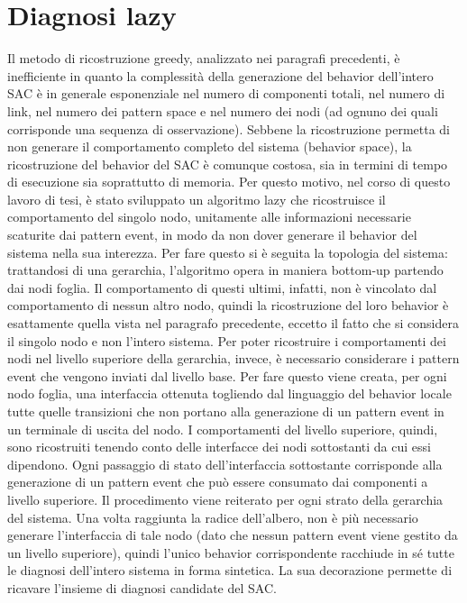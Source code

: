 \newpage
\section{Diagnosi lazy}
Il metodo di ricostruzione greedy, analizzato nei paragrafi precedenti, è inefficiente in quanto la complessità della generazione del behavior dell'intero SAC è in generale esponenziale nel numero di componenti totali, nel numero di link, nel numero dei pattern space e nel numero dei nodi (ad ognuno dei quali corrisponde una sequenza di osservazione). Sebbene la ricostruzione permetta di non generare il comportamento completo del sistema (behavior space), la ricostruzione del behavior del SAC è comunque costosa, sia in termini di tempo di esecuzione sia soprattutto di memoria.
Per questo motivo, nel corso di questo lavoro di tesi, è stato sviluppato un algoritmo lazy che ricostruisce il comportamento del singolo nodo, unitamente alle informazioni necessarie scaturite dai pattern event, in modo da non dover generare il behavior del sistema nella sua interezza. Per fare questo si è seguita la topologia del sistema: trattandosi di una gerarchia, l'algoritmo opera in maniera bottom-up partendo dai nodi foglia. Il comportamento di questi ultimi, infatti, non è vincolato dal comportamento di nessun altro nodo, quindi la ricostruzione del loro behavior è esattamente quella vista nel paragrafo precedente, eccetto il fatto che si considera il singolo nodo e non l'intero sistema. Per poter ricostruire i comportamenti dei nodi nel livello superiore della gerarchia, invece, è necessario considerare i pattern event che vengono inviati dal livello base. Per fare questo viene creata, per ogni nodo foglia, una interfaccia ottenuta togliendo dal linguaggio del behavior locale tutte quelle transizioni che non portano alla generazione di un pattern event in un terminale di uscita del nodo. I comportamenti del livello superiore, quindi, sono ricostruiti tenendo conto delle interfacce dei nodi sottostanti da cui essi dipendono. Ogni passaggio di stato dell'interfaccia sottostante corrisponde alla generazione di un pattern event che può essere consumato dai componenti a livello superiore. Il procedimento viene reiterato per ogni strato della gerarchia del sistema.
Una volta raggiunta la radice dell'albero, non è più necessario generare l'interfaccia di tale nodo (dato che nessun pattern event viene gestito da un livello superiore), quindi l'unico behavior corrispondente racchiude in sé tutte le diagnosi dell'intero sistema in forma sintetica. La sua decorazione permette di ricavare l'insieme di diagnosi candidate del SAC.

